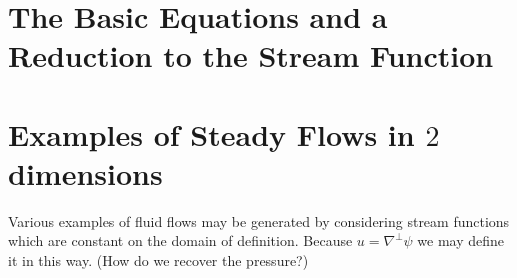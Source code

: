 \section{The Basic Equations and a Reduction to the Stream Function}

\section{Examples of Steady Flows in $2$ dimensions}

Various examples of fluid flows may be generated by considering stream functions which are constant on the domain of definition. Because $u = \nabla^\perp \psi$ we may define it in this way. (How do we recover the pressure?)
